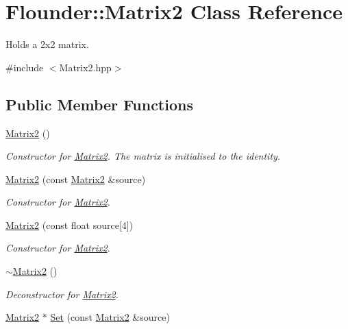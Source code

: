 \hypertarget{class_flounder_1_1_matrix2}{}\section{Flounder\+:\+:Matrix2 Class Reference}
\label{class_flounder_1_1_matrix2}


Holds a 2x2 matrix.  




{\ttfamily \#include $<$Matrix2.\+hpp$>$}

\subsection*{Public Member Functions}
\begin{DoxyCompactItemize}
\item 
\hyperlink{class_flounder_1_1_matrix2_af851e255718e0cb7ed8ecb49f2b1a814}{Matrix2} ()
\begin{DoxyCompactList}\small\item\em Constructor for \hyperlink{class_flounder_1_1_matrix2}{Matrix2}. The matrix is initialised to the identity. \end{DoxyCompactList}\item 
\hyperlink{class_flounder_1_1_matrix2_a17d61a8514344b7e29c1090275a6b3aa}{Matrix2} (const \hyperlink{class_flounder_1_1_matrix2}{Matrix2} \&source)
\begin{DoxyCompactList}\small\item\em Constructor for \hyperlink{class_flounder_1_1_matrix2}{Matrix2}. \end{DoxyCompactList}\item 
\hyperlink{class_flounder_1_1_matrix2_ad764a7be2a09d30280b1cc2355e0a379}{Matrix2} (const float source\mbox{[}4\mbox{]})
\begin{DoxyCompactList}\small\item\em Constructor for \hyperlink{class_flounder_1_1_matrix2}{Matrix2}. \end{DoxyCompactList}\item 
\hyperlink{class_flounder_1_1_matrix2_af71b245f5ee40ac4d848be11b70fbeea}{$\sim$\+Matrix2} ()
\begin{DoxyCompactList}\small\item\em Deconstructor for \hyperlink{class_flounder_1_1_matrix2}{Matrix2}. \end{DoxyCompactList}\item 
\hyperlink{class_flounder_1_1_matrix2}{Matrix2} $\ast$ \hyperlink{class_flounder_1_1_matrix2_ad1fdb2342794a345fe262fff7b8165c4}{Set} (const \hyperlink{class_flounder_1_1_matrix2}{Matrix2} \&source)

\end{DoxyCompactItemize}
